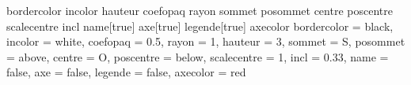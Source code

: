 
 {bordercolor}{}
 {incolor}{}
 {hauteur}{}
 {coefopaq}{}
 {rayon}{}
 {sommet}{}
 {posommet}{}
 {centre}{}
 {poscentre}{}
 {scalecentre}{}
 {incl}{}
 {name}[true]{}
 {axe}[true]{}
 {legende}[true]{}
 {axecolor}{}
 {bordercolor = black,
 							 incolor = white,
 							 coefopaq = 0.5,
 							 rayon = 1,
 							 hauteur = 3,
 							 sommet = S,
 							 posommet = above,
 							 centre = O,
 							 poscentre = below,
 							 scalecentre = 1,
 							 incl = 0.33,
 							 name = false,
 							 axe = false,
 							 legende = false,
 							 axecolor = red}{}

\newcommand*{\cone}[1][]{\pasCone[#1]}

